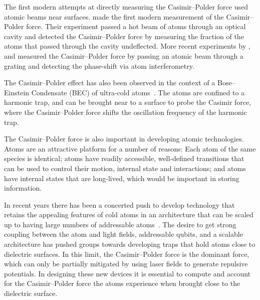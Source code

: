 The first modern attempts at directly measuring the Casimir--Polder force used atomic beams 
near surfaces.  \citet{Sukenik1993} made the first modern measurement of the Casimir--Polder force.
Their experiment passed a hot beam of atoms through an optical cavity and detected
the Casimir--Polder force by measuring the fraction of the atoms that passed through the cavity undeflected. 
More recent experiments by \citet{Perreault2005}, and \citet{Lonij2009} measured 
the Casimir--Polder force by passing an atomic beam through a grating and detecting the phase-shift via atom interferometry.  

The Casimir--Polder effect has also been observed in the context of a Bose--Einstein Condensate (BEC)
of ultra-cold atoms~\citep{Harber2005,Obrecht2007}.  %
The atoms are confined to a harmonic trap, and can be brought near to a surface to probe the Casimir
force, where the Casimir--Polder force shifts the oscillation frequency of the harmonic trap.

The Casimir--Polder force is also important in developing atomic technologies.  
Atoms are an attractive platform for a number of reasons:
Each atom of the same species is identical; 
atoms have readily accessible, well-defined transitions that can be used to control their motion,
internal state and interactions; and atoms
have internal states that are long-lived, which would be important in storing information.

In recent years there has been a concerted push to develop technology that retains the appealing features 
of cold atoms in an architecture that can be scaled up to having large numbers of addressable 
atoms~\citep{Kimble2008}.  
The desire to get strong coupling between the atom and light fields, addressable qubits, and a scalable
architecture has pushed groups towards developing traps that hold atoms close to dielectric surfaces.  
In this limit, the Casimir--Polder force is the dominant force, which can only be partially mitigated
by using laser fields to generate repulsive potentials.
In designing these new devices it is essential to compute and account for the Casimir--Polder force
the atoms experience when brought close to the dielectric surface.  

